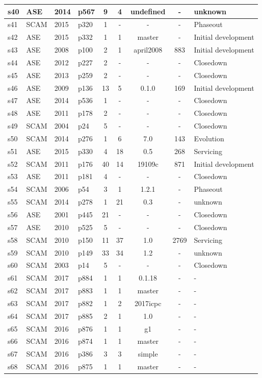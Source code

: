 \begin{longtable}{| l | l | l | l | c | c | c | c | l |}
    \hline
s40 & ASE & 2014 & p567 & 9 & 4 & undefined & - & unknown \\
    \hline
s41 & SCAM & 2015 & p320 & 1 & - & - & - & Phaseout \\
    \hline
s42 & ASE & 2015 & p332 & 1 & 1 & master & - & Initial development \\
    \hline
s43 & ASE & 2008 & p100 & 2 & 1 & april2008 & 883 & Initial development \\
    \hline
s44 & ASE & 2012 & p227 & 2 & - & - & - & Closedown \\
    \hline
s45 & ASE & 2013 & p259 & 2 & - & - & - & Closedown \\
    \hline
s46 & ASE & 2009 & p136 & 13 & 5 & 0.1.0 & 169 & Initial development \\
    \hline
s47 & ASE & 2014 & p536 & 1 & - & - & - & Closedown \\
    \hline
s48 & ASE & 2011 & p178 & 2 & - & - & - & Closedown \\
    \hline
s49 & SCAM & 2004 & p24 & 5 & - & - & - & Closedown \\
    \hline
s50 & SCAM & 2014 & p276 & 1 & 6 & 7.0 & 143 & Evolution \\
    \hline
s51 & ASE & 2015 & p330 & 4 & 18 & 0.5 & 268 & Servicing \\
    \hline
s52 & SCAM & 2011 & p176 & 40 & 14 & 19109c & 871 & Initial development \\
    \hline
s53 & ASE & 2011 & p181 & 4 & - & - & - & Closedown \\
    \hline
s54 & SCAM & 2006 & p54 & 3 & 1 & 1.2.1 & - & Phaseout \\
    \hline
s55 & SCAM & 2014 & p278 & 1 & 21 & 0.3 & - & unknown \\
    \hline
s56 & ASE & 2001 & p445 & 21 & - & - & - & Closedown \\
    \hline
s57 & ASE & 2010 & p525 & 5 & - & - & - & Closedown \\
    \hline
s58 & SCAM & 2010 & p150 & 11 & 37 & 1.0 & 2769 & Servicing \\
    \hline
s59 & SCAM & 2010 & p149 & 33 & 34 & 1.2 & - & unknown \\
    \hline
s60 & SCAM & 2003 & p14 & 5 & - & - & - & Closedown \\
    \hline
s61 & SCAM & 2017 & p884 & 1 & 1 & 0.1.18 & - & - \\
    \hline
s62 & SCAM & 2017 & p883 & 1 & 1 & master & - & - \\
    \hline
s63 & SCAM & 2017 & p882 & 1 & 2 & 2017icpc & - & - \\
    \hline
s64 & SCAM & 2017 & p885 & 2 & 1 & 1.0 & - & - \\
    \hline
s65 & SCAM & 2016 & p876 & 1 & 1 & g1 & - & - \\
    \hline
s66 & SCAM & 2016 & p874 & 1 & 1 & master & - & - \\
    \hline
s67 & SCAM & 2016 & p386 & 3 & 3 & simple & - & - \\
    \hline
s68 & SCAM & 2016 & p875 & 1 & 1 & master & - & - \\
    \hline
  \hline
\end{longtable}
